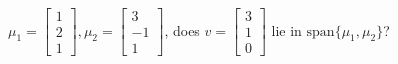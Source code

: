 \begin{example}
	$\mu_1=\begin{bmatrix}
		1\\2\\1
	\end{bmatrix}, \mu_2=\begin{bmatrix}
		3\\-1\\1
	\end{bmatrix}$, does $v = \begin{bmatrix}
		3\\1\\0
	\end{bmatrix}$ lie in $\mathrm{span}\{\mu_1, \mu_2\}$? 
\end{example}